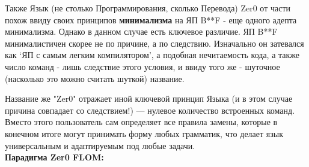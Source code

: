 \documentclass{book}
\begin{document}
Также Язык (не столько Программирования, сколько Перевода) Zer0 от части похож ввиду своих принципов \textbf{минимализма} на ЯП B**F - еще одного адепта минимализма. Однако в данном случае есть ключевое различие. ЯП B**F минималистичен скорее не по причине, а по следствию. Изначально он затевался как `ЯП с самым легким компилятором', а подобная нечитаемость кода, а также число команд - лишь следствие этого условия, и ввиду того же - шуточное (насколько это можно считать шуткой) название.

Название же "Zer0" отражает иной ключевой принцип Языка (и в этом случае причина совпадает со следствием!) — нулевое количество встроенных команд. Вместо этого пользователь сам определяет все правила замены, которые в конечном итоге могут принимать форму любых грамматик, что делает язык универсальным и адаптируемым под любые задачи.\\

\textbf{Парадигма Zer0 FLOM:}
\end{document}
